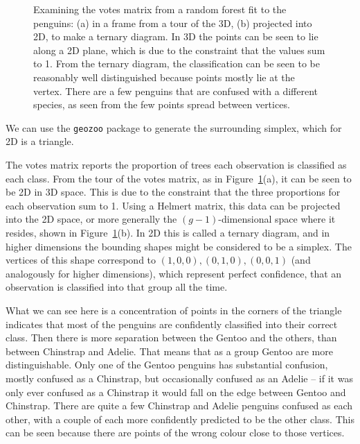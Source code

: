 \documentclass[
  letterpaper,
]{krantz}
\begin{document}
\begin{figure}
\begin{minipage}[t]{0.50\linewidth}
{{}

}

\end{minipage}%

\caption{\label{fig-penguins-votes-pdf}Examining the votes matrix from a
random forest fit to the penguins: (a) in a frame from a tour of the 3D,
(b) projected into 2D, to make a ternary diagram. In 3D the points can
be seen to lie along a 2D plane, which is due to the constraint that the
values sum to 1. From the ternary diagram, the classification can be
seen to be reasonably well distinguished because points mostly lie at
the vertex. There are a few penguins that are confused with a different
species, as seen from the few points spread between vertices.}

\end{figure}

We can use the \texttt{geozoo} package to generate the surrounding
simplex, which for 2D is a triangle.

The votes matrix reports the proportion of trees each observation is
classified as each class. From the tour of the votes matrix, as in
Figure~\ref{fig-penguins-votes-pdf}(a), it can be seen to be 2D in 3D
space. This is due to the constraint that the three proportions for each
observation sum to 1. Using a Helmert matrix, this data can be projected
into the 2D space, or more generally the \((g-1)\)-dimensional space
where it resides, shown in Figure~\ref{fig-penguins-votes-pdf}(b). In 2D
this is called a ternary diagram, and in higher dimensions the bounding
shapes might be considered to be a simplex. The vertices of this shape
correspond to \((1,0,0), (0,1,0), (0,0,1)\) (and analogously for higher
dimensions), which represent perfect confidence, that an observation is
classified into that group all the time.

What we can see here is a concentration of points in the corners of the
triangle indicates that most of the penguins are confidently classified
into their correct class. Then there is more separation between the
Gentoo and the others, than between Chinstrap and Adelie. That means
that as a group Gentoo are more distinguishable. Only one of the Gentoo
penguins has substantial confusion, mostly confused as a Chinstrap, but
occasionally confused as an Adelie -- if it was only ever confused as a
Chinstrap it would fall on the edge between Gentoo and Chinstrap. There
are quite a few Chinstrap and Adelie penguins confused as each other,
with a couple of each more confidently predicted to be the other class.
This can be seen because there are points of the wrong colour close to
those vertices.
\end{document}

